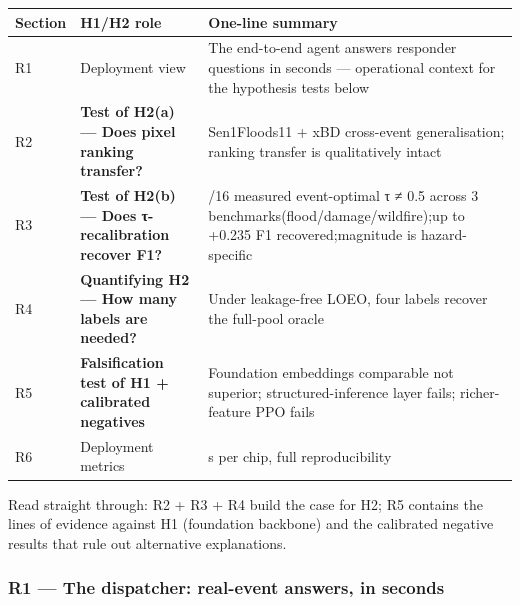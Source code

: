 \begin{longtable}[]{@{}
  >{\raggedright\arraybackslash}p{}
  >{\raggedright\arraybackslash}p{}
  >{\raggedright\arraybackslash}p{}@{}}
\toprule\noalign{}
\begin{minipage}[b]{\linewidth}\raggedright
Section
\end{minipage} & \begin{minipage}[b]{\linewidth}\raggedright
H1/H2 role
\end{minipage} & \begin{minipage}[b]{\linewidth}\raggedright
One-line summary
\end{minipage} \\
\midrule\noalign{}
\endhead
\bottomrule\noalign{}
\endlastfoot
R1 & Deployment view & The end-to-end agent answers responder questions in seconds --- operational context for the hypothesis tests below \\
R2 & \textbf{Test of H2(a) --- Does pixel ranking transfer?} & Sen1Floods11 + xBD cross-event generalisation; ranking transfer is qualitatively intact \\
R3 & \textbf{Test of H2(b) --- Does τ-recalibration recover F1?} & 15/16 measured event-optimal τ ≠ 0.5 across 3 benchmarks(flood/damage/wildfire);up to +0.235 F1 recovered;magnitude is hazard-specific \\
R4 & \textbf{Quantifying H2 --- How many labels are needed?} & Under leakage-free LOEO, four labels recover the full-pool oracle \\
R5 & \textbf{Falsification test of H1 + calibrated negatives} & Foundation embeddings comparable not superior; structured-inference layer fails; richer-feature PPO fails \\
R6 & Deployment metrics & 0.031 s per chip, full reproducibility \\
\end{longtable}

Read straight through: R2 + R3 + R4 build the case for H2; R5 contains
the lines of evidence against H1 (foundation backbone) and the
calibrated negative results that rule out alternative explanations.

\subsubsection{R1 --- The dispatcher: real-event answers, in seconds}\label{r1-the-dispatcher-real-event-answers-in-seconds}

